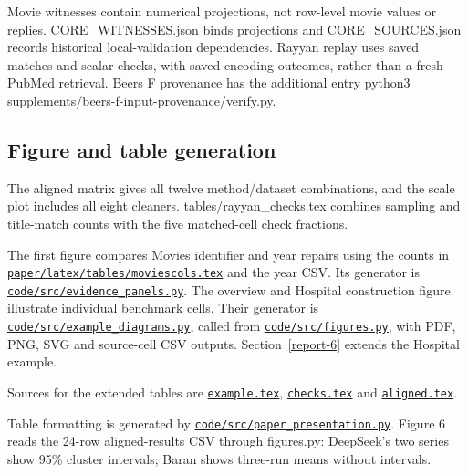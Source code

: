 \documentclass[10pt,a4paper]{article}
\begin{document}
Movie witnesses contain numerical projections, not row-level movie values or replies. {\ttfamily\small CORE\_\allowbreak{}WITNESSES.json} binds projections and {\ttfamily\small CORE\_\allowbreak{}SOURCES.json} records historical local-validation dependencies. Rayyan replay uses saved matches and scalar checks, with saved encoding outcomes, rather than a fresh PubMed retrieval. Beers F provenance has the additional entry {\ttfamily\small python3 supplements/\allowbreak{}beers-f-input-provenance/\allowbreak{}verify.py}.

\subsection{Figure and table generation}

The aligned matrix gives all twelve method/dataset combinations, and the scale plot includes
all eight cleaners. {\ttfamily\small tables/\allowbreak{}rayyan\_\allowbreak{}checks.tex} combines sampling and title-match counts with the five matched-cell check fractions.

The first figure compares Movies identifier and year repairs using the counts in \href{https://github.com/hinsonver/CoRe-Benchmark/blob/main/paper/latex/tables/moviescols.tex}{\nolinkurl{paper/latex/tables/moviescols.tex}} and the year CSV. Its generator is \href{https://github.com/hinsonver/CoRe-Benchmark/blob/main/code/src/evidence_panels.py}{\nolinkurl{code/src/evidence_panels.py}}. The overview and Hospital construction figure illustrate individual benchmark cells. Their generator is \href{https://github.com/hinsonver/CoRe-Benchmark/blob/main/code/src/example_diagrams.py}{\nolinkurl{code/src/example_diagrams.py}}, called from \href{https://github.com/hinsonver/CoRe-Benchmark/blob/main/code/src/figures.py}{\nolinkurl{code/src/figures.py}}, with PDF, PNG, SVG and source-cell CSV outputs. Section~\ref{report-6} extends the Hospital example.

Sources for the extended tables are \href{https://github.com/hinsonver/CoRe-Benchmark/blob/main/paper/latex/tables/example.tex}{\texttt{example.tex}}, \href{https://github.com/hinsonver/CoRe-Benchmark/blob/main/paper/latex/tables/checks.tex}{\texttt{checks.tex}} and \href{https://github.com/hinsonver/CoRe-Benchmark/blob/main/paper/latex/tables/aligned.tex}{\texttt{aligned.tex}}.

Table formatting is generated by \href{https://github.com/hinsonver/CoRe-Benchmark/blob/main/code/src/paper_presentation.py}{\nolinkurl{code/src/paper_presentation.py}}. Figure 6 reads the 24-row aligned-results CSV through {\ttfamily\small figures.py}: DeepSeek's two series show 95\% cluster intervals; Baran shows three-run means without intervals.
\end{document}
